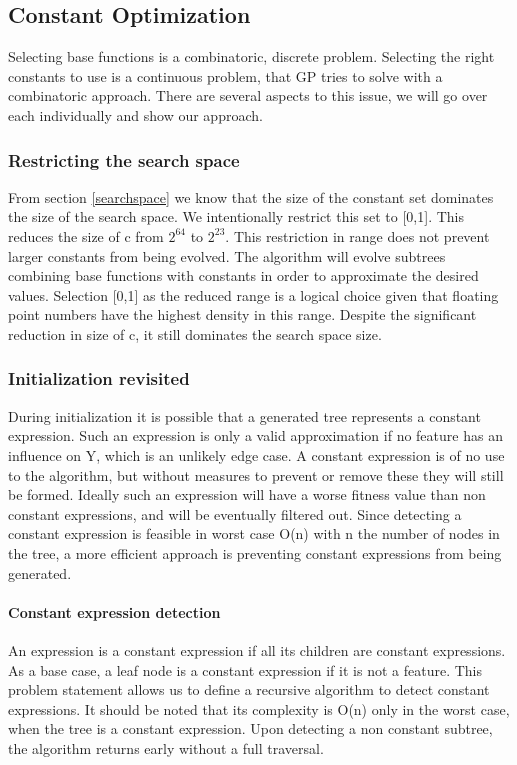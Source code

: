 \subsection{Constant Optimization} \label{subconstantoptimization}
Selecting base functions is a combinatoric, discrete problem. Selecting the right constants to use is a continuous problem, that GP tries to solve with a combinatoric approach. There are several aspects to this issue, we will go over each individually and show our approach. 

\subsubsection{Restricting the search space}
From section \ref{searchspace} we know that the size of the constant set dominates the size of the search space. We intentionally restrict this set to [0,1]. This reduces the size of c from $2^64$ to $2^23$. This restriction in range does not prevent larger constants from being evolved. The algorithm will evolve subtrees combining base functions with constants in order to approximate the desired values. Selection [0,1] as the reduced range is a logical choice given that floating point numbers have the highest density in this range. Despite the significant reduction in size of c, it still dominates the search space size.

\subsubsection{Initialization revisited}
During initialization it is possible that a generated tree represents a constant expression. Such an expression is only a valid approximation if no feature has an influence on Y, which is an unlikely edge case. A constant expression is of no use to the algorithm, but without measures to prevent or remove these they will still be formed. Ideally such an expression will have a worse fitness value than non constant expressions, and will be eventually filtered out. Since detecting a constant expression is feasible in worst case O(n) with n the number of nodes in the tree, a more efficient approach is preventing constant expressions from being generated. 

\paragraph{Constant expression detection}
An expression is a constant expression if all its children are constant expressions. As a base case, a leaf node is a constant expression if it is not a feature. This problem statement allows us to define a recursive algorithm to detect constant expressions. It should be noted that its complexity is O(n) only in the worst case, when the tree is a constant expression. Upon detecting a non constant subtree, the algorithm returns early without a full traversal. 

